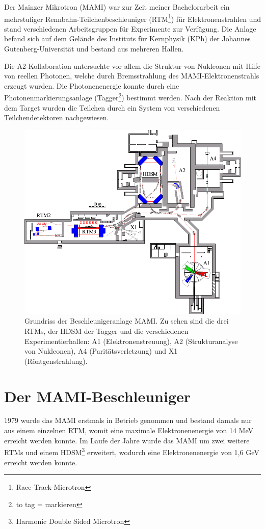 \documentclass[a4paper,11pt,oneside,final,german,openbib,pdftex]{scrbook}
\begin{document}
{Der Mainzer Mikrotron (MAMI) war zur Zeit meiner Bachelorarbeit ein mehrstufiger Rennbahn-Teilchenbeschleuniger (RTM\footnote{Race-Track-Microtron}) für Elektronenstrahlen und stand verschiedenen Arbeitsgruppen für Experimente zur Verfügung. Die Anlage befand sich auf dem Gelände des Instituts für Kernphysik (KPh) der Johannes Gutenberg-Universität 
und bestand aus mehreren Hallen.

Die A2-Kollaboration untersuchte vor allem die Struktur von Nukleonen mit Hilfe von reellen Photonen, welche durch Bremsstrahlung des MAMI-Elektronenstrahls erzeugt wurden. Die Photonenenergie konnte durch eine Photonenmarkierungsanlage (Tagger\footnote{to tag = markieren}) bestimmt werden. Nach der Reaktion mit dem Target wurden die Teilchen durch ein System von verschiedenen Teilchendetektoren nachgewiesen.

\begin{figure}[h!]
	
	\includegraphics{grundriss}
	\caption{Grundriss der Beschleunigeranlage MAMI. Zu sehen sind die drei RTMs, der HDSM der Tagger und die verschiedenen Experimentierhallen: A1 (Elektronenstreuung), A2 (Strukturanalyse von Nukleonen), A4 (Parit\"atsverletzung) und X1 (R\"ontgenstrahlung). \cite{KPh07}}
	\label{fig.grundriss_anlage}
\end{figure}


\section{Der MAMI-Beschleuniger}
1979 wurde das MAMI erstmals in Betrieb genommen und bestand damals nur aus einem einzelnen RTM, womit eine maximale Elektronenenergie von 14 MeV erreicht werden konnte. 
Im Laufe der Jahre wurde das MAMI um zwei weitere RTMs und einem HDSM\footnote{Harmonic Double Sided Microtron} erweitert, wodurch eine Elektronenenergie von 1,6 GeV erreicht werden konnte.\cite{KPh11G} 
\newline


}
\end{document}
